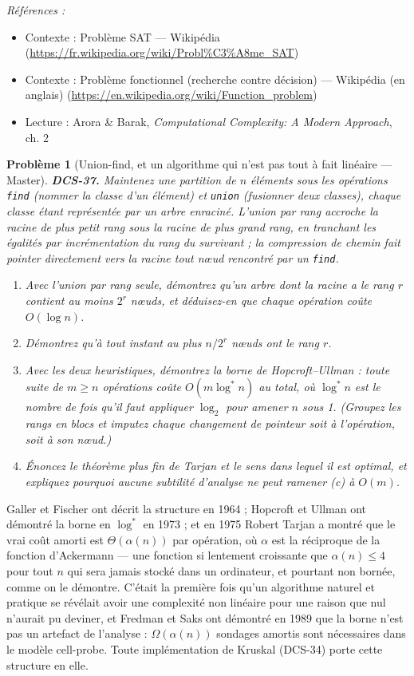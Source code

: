 \documentclass[11pt]{article}
\newtheorem{problem}{Problème}
\newenvironment{refs}{\par\small\noindent\emph{Références :}\begin{itemize}\setlength\itemsep{0pt}}{\end{itemize}\normalsize}
\begin{document}
\begin{refs}
\item Contexte : Problème SAT --- Wikipédia (\url{https://fr.wikipedia.org/wiki/Probl%C3%A8me_SAT})
\item Contexte : Problème fonctionnel (recherche contre décision) --- Wikipédia (en anglais) (\url{https://en.wikipedia.org/wiki/Function_problem})
\item Lecture : Arora \& Barak, \textit{Computational Complexity: A Modern Approach}, ch. 2
\end{refs}

\bigskip

\begin{problem}[{Union-find, et un algorithme qui n'est pas tout à fait linéaire --- Master}]
\textbf{DCS-37.} Maintenez une partition de $n$ éléments sous les opérations \texttt{find} (nommer la classe d'un élément) et \texttt{union} (fusionner deux classes), chaque classe étant représentée par un arbre enraciné. L'\textit{union par rang} accroche la racine de plus petit rang sous la racine de plus grand rang, en tranchant les égalités par incrémentation du rang du survivant ; la \textit{compression de chemin} fait pointer directement vers la racine tout n\oe{}ud rencontré par un \texttt{find}.
\begin{enumerate}
\item[(a)] Avec l'union par rang seule, démontrez qu'un arbre dont la racine a le rang $r$ contient au moins $2^r$ n\oe{}uds, et déduisez-en que chaque opération coûte $O(\log n)$.
\item[(b)] Démontrez qu'à tout instant au plus $n/2^r$ n\oe{}uds ont le rang $r$.
\item[(c)] Avec les deux heuristiques, démontrez la borne de Hopcroft--Ullman : toute suite de $m \ge n$ opérations coûte $O(m \log^{*} n)$ au total, où $\log^{*} n$ est le nombre de fois qu'il faut appliquer $\log_2$ pour amener $n$ sous 1. (Groupez les rangs en blocs et imputez chaque changement de pointeur soit à l'opération, soit à son n\oe{}ud.)
\item[(d)] Énoncez le théorème plus fin de Tarjan et le sens dans lequel il est optimal, et expliquez pourquoi aucune subtilité d'analyse ne peut ramener (c) à $O(m)$.
\end{enumerate}

\end{problem}

\noindent Galler et Fischer ont décrit la structure en 1964 ; Hopcroft et Ullman ont démontré la borne en $\log^{*}$ en 1973 ; et en 1975 Robert Tarjan a montré que le vrai coût amorti est $\Theta(\alpha(n))$ par opération, où $\alpha$ est la réciproque de la fonction d'Ackermann --- une fonction si lentement croissante que $\alpha(n) \le 4$ pour tout $n$ qui sera jamais stocké dans un ordinateur, et pourtant non bornée, comme on le démontre. C'était la première fois qu'un algorithme naturel et pratique se révélait avoir une complexité non linéaire pour une raison que nul n'aurait pu deviner, et Fredman et Saks ont démontré en 1989 que la borne n'est pas un artefact de l'analyse : $\Omega(\alpha(n))$ sondages amortis sont nécessaires dans le modèle cell-probe. Toute implémentation de Kruskal (DCS-34) porte cette structure en elle.
\end{document}
